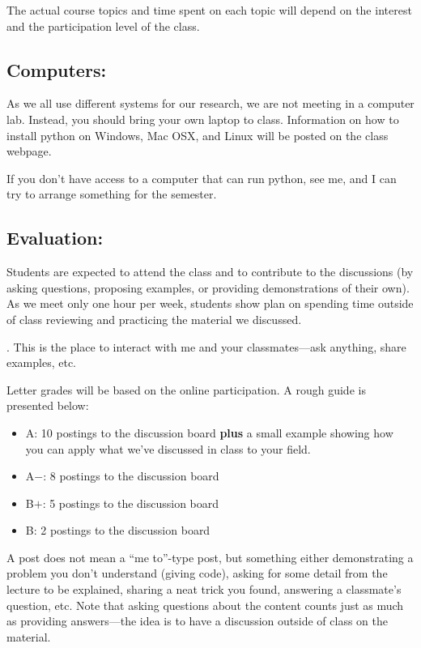 \documentclass[11pt]{article}
\begin{document}
\noindent The actual course topics and time spent on each topic will depend on the
interest and the participation level of the class.


\subsection*{Computers:} 
%
As we all use different systems for our research, we are not meeting
in a computer lab.  Instead, you should bring your own laptop to
class.  Information on how to install python on Windows, Mac OSX, and
Linux will be posted on the class webpage. 

\noindent
If you don't have access to a computer that can run python, see me,
and I can try to arrange something for the semester.


\subsection*{Evaluation:} 

Students are expected to attend the class and to contribute
to the discussions (by asking questions, proposing examples, or
providing demonstrations of their own).  As we meet only one hour per
week, students show plan on spending time outside of class reviewing
and practicing the material we discussed. 

.  This is the place to interact with
me and your classmates---ask anything, share examples, etc. 

\noindent Letter grades will be based on the online participation.  A
rough guide is presented below:
\begin{itemize}
\item {\sf A\phantom{+}}: 10 postings to the discussion board
  {\bf plus} a small example showing how you can apply what
  we've discussed in class to your field.

\item {\sf A$-$}: 8 postings to the discussion board

\item {\sf B$+$}: 5 postings to the discussion board

\item {\sf B\phantom{+}}:  2 postings to the discussion board
\end{itemize}
A post does not mean a ``me to''-type post, but something either
demonstrating a problem you don't understand (giving code), asking for
some detail from the lecture to be explained, sharing a neat trick you
found, answering a classmate's question, etc.  Note that asking
questions about the content counts just as much as providing
answers---the idea is to have a discussion outside of class on the
material.
\end{document}
